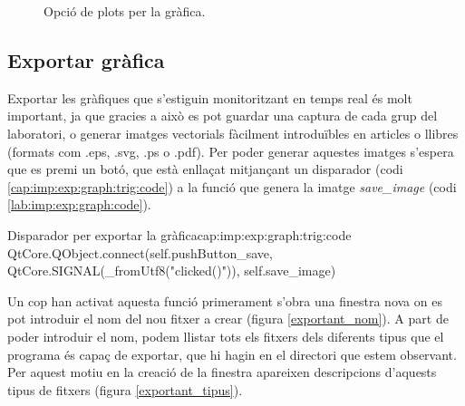 \begin{figure}[ht!]
\begin{center}
\end{center}
	\caption{Opció de plots per la gràfica.}
    \label{fig:comparacio:plots}
\end{figure}

\FloatBarrier

\subsection{Exportar gràfica}\label{cap:imp:exp:graph}

Exportar les gràfiques que s'estiguin monitoritzant en temps real és molt important, ja que gracies a això es pot guardar una captura de cada grup del laboratori, o generar imatges vectorials fàcilment introduïbles en articles o llibres (formats com .eps, .svg, .ps o .pdf).
Per poder generar aquestes imatges s'espera que es premi un botó, que està enllaçat mitjançant un disparador (codi \ref{cap:imp:exp:graph:trig:code}) a la funció que genera la imatge \emph{save\_image} (codi \ref{lab:imp:exp:graph:code}).

\begin{code_python}{Disparador per exportar la gràfica}{cap:imp:exp:graph:trig:code}
QtCore.QObject.connect(self.pushButton_save, QtCore.SIGNAL(_fromUtf8("clicked()")), self.save_image)
\end{code_python}

Un cop han activat aquesta funció primerament s'obra una finestra nova on es pot introduir el nom del nou fitxer a crear (figura \ref{exportant_nom}). A part de poder introduir el nom, podem llistar tots els fitxers dels diferents tipus que el programa és capaç de exportar, que hi hagin en el directori que estem observant. Per aquest motiu en la creació de la finestra apareixen descripcions d'aquests tipus de fitxers (figura \ref{exportant_tipus}).



